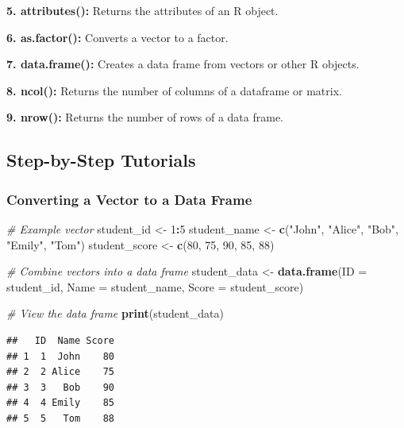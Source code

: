 \documentclass[
]{book}
\newenvironment{Shaded}{\begin{snugshade}}{\end{snugshade}}
\newcommand{\AttributeTok}[1]{\textcolor[rgb]{0.13,0.29,0.53}{#1}}
\newcommand{\CommentTok}[1]{\textcolor[rgb]{0.56,0.35,0.01}{\textit{#1}}}
\newcommand{\DecValTok}[1]{\textcolor[rgb]{0.00,0.00,0.81}{#1}}
\newcommand{\FunctionTok}[1]{\textcolor[rgb]{0.13,0.29,0.53}{\textbf{#1}}}
\newcommand{\NormalTok}[1]{#1}
\newcommand{\OtherTok}[1]{\textcolor[rgb]{0.56,0.35,0.01}{#1}}
\newcommand{\SpecialCharTok}[1]{\textcolor[rgb]{0.81,0.36,0.00}{\textbf{#1}}}
\newcommand{\StringTok}[1]{\textcolor[rgb]{0.31,0.60,0.02}{#1}}
\begin{document}
\textbf{5. attributes():} Returns the attributes of an R object.

\textbf{6. as.factor():} Converts a vector to a factor.

\textbf{7. data.frame():} Creates a data frame from vectors or other R objects.

\textbf{8. ncol():} Returns the number of columns of a dataframe or matrix.

\textbf{9. nrow():} Returns the number of rows of a data frame.

\subsection{Step-by-Step Tutorials}\label{step-by-step-tutorials}

\subsubsection{Converting a Vector to a Data Frame}\label{converting-a-vector-to-a-data-frame}

\begin{Shaded}
\begin{Highlighting}[]
\CommentTok{\# Example vector}
\NormalTok{student\_id }\OtherTok{\textless{}{-}} \DecValTok{1}\SpecialCharTok{:}\DecValTok{5}
\NormalTok{student\_name }\OtherTok{\textless{}{-}} \FunctionTok{c}\NormalTok{(}\StringTok{"John"}\NormalTok{, }\StringTok{"Alice"}\NormalTok{, }\StringTok{"Bob"}\NormalTok{, }\StringTok{"Emily"}\NormalTok{, }\StringTok{"Tom"}\NormalTok{)}
\NormalTok{student\_score }\OtherTok{\textless{}{-}} \FunctionTok{c}\NormalTok{(}\DecValTok{80}\NormalTok{, }\DecValTok{75}\NormalTok{, }\DecValTok{90}\NormalTok{, }\DecValTok{85}\NormalTok{, }\DecValTok{88}\NormalTok{)}

\CommentTok{\# Combine vectors into a data frame}
\NormalTok{student\_data }\OtherTok{\textless{}{-}} \FunctionTok{data.frame}\NormalTok{(}\AttributeTok{ID =}\NormalTok{ student\_id, }\AttributeTok{Name =}\NormalTok{ student\_name, }\AttributeTok{Score =}\NormalTok{ student\_score)}

\CommentTok{\# View the data frame}
\FunctionTok{print}\NormalTok{(student\_data)}
\end{Highlighting}
\end{Shaded}

\begin{verbatim}
##   ID  Name Score
## 1  1  John    80
## 2  2 Alice    75
## 3  3   Bob    90
## 4  4 Emily    85
## 5  5   Tom    88
\end{verbatim}
\end{document}
